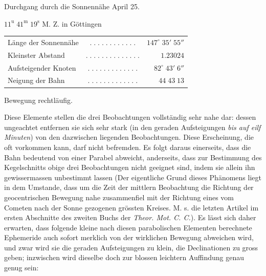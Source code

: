 \begin{center}\fontsize{10}{12}\selectfont Durchgang durch die Sonnennähe April 25.\par $11^{\mathrm u}\;41^{\mathrm m}\;19^{\mathrm s}$ M. Z. in Göttingen\end{center}
\begin{center}\fontsize{10}{12}\selectfont\setlength{\tabcolsep}{3pt}\renewcommand{\arraystretch}{1.15}\begin{tabular}{lcr}
Länge der Sonnennähe & $.\;.\;.\;.\;.\;.\;.\;.\;.\;.\;.\;.$ & $147^\circ\;35'\;55''$\\
Kleinster Abstand & $.\;.\;.\;.\;.\;.\;.\;.\;.\;.\;.\;.\;.\;.$ & $1.23024$\\
Aufsteigender Knoten & $.\;.\;.\;.\;.\;.\;.\;.\;.\;.\;.\;.\;.$ & $82^\circ\;43'\;6''$\\
Neigung der Bahn & $.\;.\;.\;.\;.\;.\;.\;.\;.\;.\;.\;.\;.$ & $44\;43\;13$\\
\end{tabular}\end{center}\begin{center}Bewegung rechtläufig.\end{center}

\par\indent Diese Elemente stellen die drei Beobachtungen vollständig sehr nahe dar: dessen ungeachtet
entfernen sie sich sehr stark (in den geraden Aufsteigungen \emph{bis auf eilf Minuten}) von den
dazwischen liegenden Beobachtungen. Diese Erscheinung, die oft vorkommen kann, darf nicht
befremden. Es folgt daraus einerseits, dass die Bahn bedeutend von einer Parabel abweicht,
anderseits, dass zur Bestimmung des Kegelschnitts obige drei Beobachtungen nicht geeignet sind,
indem sie allein ihn gewissermassen unbestimmt lassen (Der eigentliche Grund dieses Phänomens
liegt in dem Umstande, dass um die Zeit der mittlern Beobachtung die Richtung der geocentrischen
Bewegung nahe zusammenfiel mit der Richtung eines vom Cometen nach der Sonne gezogenen grössten
Kreises. M. s. die letzten Artikel im ersten Abschnitte des zweiten Buchs der \emph{Theor. Mot.
C. C.}). Es lässt sich daher erwarten, dass folgende kleine nach diesen parabolischen Elementen
berechnete Ephemeride auch sofort merklich von der wirklichen Bewegung abweichen wird, und zwar
wird sie die geraden Aufsteigungen zu klein, die Declinationen zu gross geben; inzwischen wird
dieselbe doch zur blossen leichtern Auffindung genau genug sein:

